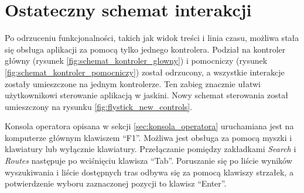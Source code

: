 \section{Ostateczny schemat interakcji}
\label{sec:schemat_interakcji}
Po odrzuceniu funkcjonalności, takich jak widok treści i linia czasu, możliwa stała się obsługa aplikacji za pomocą tylko jednego kontrolera. Podział na kontroler główny (rysunek \ref{fig:schemat_kontroler_glowny}) i pomocniczy (rysunek \ref{fig:schemat_kontroler_pomocniczy}) został odrzucony, a wszystkie interakcje zostały umieszczone na jednym kontrolerze. Ten zabieg znacznie ułatwi użytkownikowi sterowanie aplikacją w jaskini. Nowy schemat sterowania został umieszczony na rysunku \ref{fig:flystick_new_controls}.


Konsola operatora opisana w sekcji \ref{sec:konsola_operatora} uruchamiana jest na komputerze głównym klawiszem ``F1''. Możliwa jest obsługa za pomocą myszki i klawiatury lub wyłącznie klawiatury. Przełączanie pomiędzy zakładkami \textit{Search} i \textit{Routes} następuje po wciśnięciu klawisza ``Tab''. Poruszanie się po liście wyników wyszukiwania i liście dostępnych tras odbywa się za pomocą klawiszy strzałek, a potwierdzenie wyboru zaznaczonej pozycji to klawisz ``Enter''.